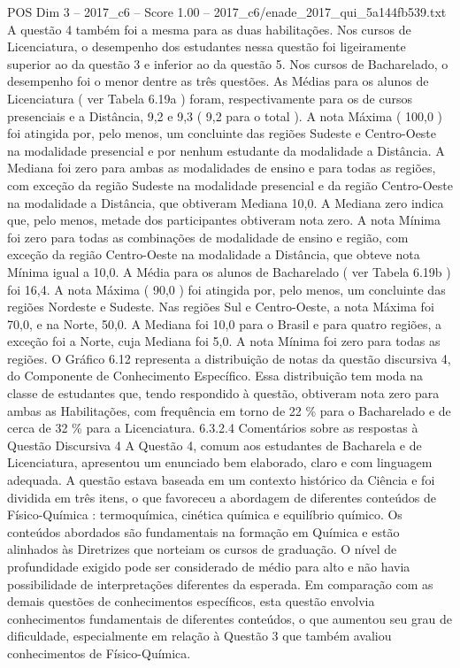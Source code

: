 \begin{textsample}{POS Dim 3 – 2017\_c6 – Score 1.00 – 2017\_c6/enade\_2017\_qui\_5a144fb539.txt}
A questão 4 também foi a mesma para as duas habilitações.
Nos cursos de Licenciatura, o desempenho dos estudantes nessa questão foi ligeiramente superior ao da questão 3 e inferior ao da questão 5.
Nos cursos de Bacharelado, o desempenho foi o menor dentre as três questões.
As Médias para os alunos de Licenciatura ( ver Tabela 6.19a ) foram, respectivamente para os de cursos presenciais e a Distância, 9,2 e 9,3 ( 9,2 para o total ).
A nota Máxima ( 100,0 ) foi atingida por, pelo menos, um concluinte das regiões Sudeste e Centro-Oeste na modalidade presencial e por nenhum estudante da modalidade a Distância.
A Mediana foi zero para ambas as modalidades de ensino e para todas as regiões, com exceção da região Sudeste na modalidade presencial e da região Centro-Oeste na modalidade a Distância, que obtiveram Mediana 10,0.
A Mediana zero indica que, pelo menos, metade dos participantes obtiveram nota zero.
A nota Mínima foi zero para todas as combinações de modalidade de ensino e região, com exceção da região Centro-Oeste na modalidade a Distância, que obteve nota Mínima igual a 10,0.
A Média para os alunos de Bacharelado ( ver Tabela 6.19b ) foi 16,4.
A nota Máxima ( 90,0 ) foi atingida por, pelo menos, um concluinte das regiões Nordeste e Sudeste.
Nas regiões Sul e Centro-Oeste, a nota Máxima foi 70,0, e na Norte, 50,0.
A Mediana foi 10,0 para o Brasil e para quatro regiões, a exceção foi a Norte, cuja Mediana foi 5,0.
A nota Mínima foi zero para todas as regiões.
O Gráfico 6.12 representa a distribuição de notas da questão discursiva 4, do Componente de Conhecimento Específico.
Essa distribuição tem moda na classe de estudantes que, tendo respondido à questão, obtiveram nota zero para ambas as Habilitações, com frequência em torno de 22 \% para o Bacharelado e de cerca de 32 \% para a Licenciatura. 6.3.2.4 Comentários sobre as respostas à Questão Discursiva 4 A Questão 4, comum aos estudantes de Bacharela e de Licenciatura, apresentou um enunciado bem elaborado, claro e com linguagem adequada.
A questão estava baseada em um contexto histórico da Ciência e foi dividida em três itens, o que favoreceu a abordagem de diferentes conteúdos de Físico-Química : termoquímica, cinética química e equilíbrio químico.
Os conteúdos abordados são fundamentais na formação em Química e estão alinhados às Diretrizes que norteiam os cursos de graduação.
O nível de profundidade exigido pode ser considerado de médio para alto e não havia possibilidade de interpretações diferentes da esperada.
Em comparação com as demais questões de conhecimentos específicos, esta questão envolvia conhecimentos fundamentais de diferentes conteúdos, o que aumentou seu grau de dificuldade, especialmente em relação à Questão 3 que também avaliou conhecimentos de Físico-Química.

\end{textsample}
